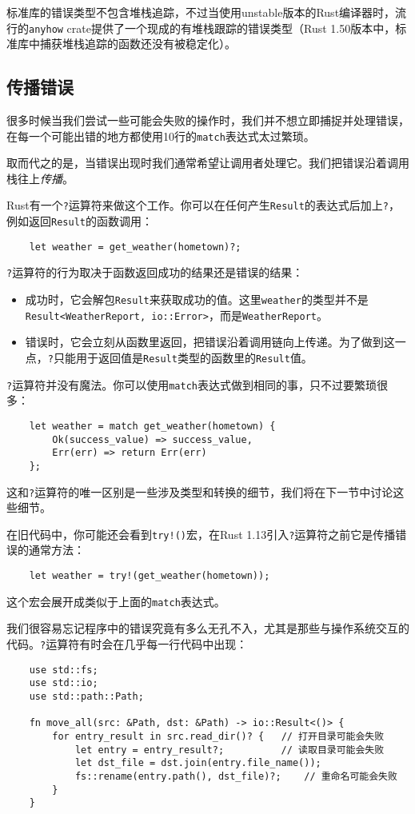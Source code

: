 标准库的错误类型不包含堆栈追踪，不过当使用unstable版本的Rust编译器时，流行的\texttt{anyhow} crate提供了一个现成的有堆栈跟踪的错误类型（Rust 1.50版本中，标准库中捕获堆栈追踪的函数还没有被稳定化）。

\subsection{传播错误}\label{properror}
很多时候当我们尝试一些可能会失败的操作时，我们并不想立即捕捉并处理错误，在每一个可能出错的地方都使用10行的\texttt{match}表达式太过繁琐。

取而代之的是，当错误出现时我们通常希望让调用者处理它。我们把错误沿着调用栈往上\emph{传播}。

Rust有一个\texttt{?}运算符来做这个工作。你可以在任何产生\texttt{Result}的表达式后加上\texttt{?}，例如返回\texttt{Result}的函数调用：
\begin{verbatim}
    let weather = get_weather(hometown)?;
\end{verbatim}

\texttt{?}运算符的行为取决于函数返回成功的结果还是错误的结果：
\begin{itemize}
    \item 成功时，它会解包\texttt{Result}来获取成功的值。这里\texttt{weather}的类型并不是\texttt{Result<WeatherReport, io::Error>}，而是\texttt{WeatherReport}。
    \item 错误时，它会立刻从函数里返回，把错误沿着调用链向上传递。为了做到这一点，\texttt{?}只能用于返回值是\texttt{Result}类型的函数里的\texttt{Result}值。
\end{itemize}

\texttt{?}运算符并没有魔法。你可以使用\texttt{match}表达式做到相同的事，只不过要繁琐很多：
\begin{verbatim}
    let weather = match get_weather(hometown) {
        Ok(success_value) => success_value,
        Err(err) => return Err(err)
    };
\end{verbatim}

这和\texttt{?}运算符的唯一区别是一些涉及类型和转换的细节，我们将在下一节中讨论这些细节。

在旧代码中，你可能还会看到\texttt{try!()}宏，在Rust 1.13引入\texttt{?}运算符之前它是传播错误的通常方法：
\begin{verbatim}
    let weather = try!(get_weather(hometown));
\end{verbatim}
这个宏会展开成类似于上面的\texttt{match}表达式。

我们很容易忘记程序中的错误究竟有多么无孔不入，尤其是那些与操作系统交互的代码。\texttt{?}运算符有时会在几乎每一行代码中出现：
\begin{verbatim}
    use std::fs;
    use std::io;
    use std::path::Path;

    fn move_all(src: &Path, dst: &Path) -> io::Result<()> {
        for entry_result in src.read_dir()? {   // 打开目录可能会失败
            let entry = entry_result?;          // 读取目录可能会失败
            let dst_file = dst.join(entry.file_name());
            fs::rename(entry.path(), dst_file)?;    // 重命名可能会失败
        }
    }
\end{verbatim}

